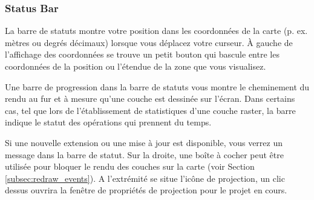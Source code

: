 %
%
%

\subsubsection{Status Bar}\label{label_statusbar}

La barre de statuts montre votre position dans les coordonnées de la carte (p. ex. mètres ou degrés décimaux) lorsque vous déplacez votre curseur. À gauche de l'affichage des coordonnées se trouve un petit bouton qui bascule entre les coordonnées de la position ou l'étendue de la zone que vous visualisez.

Une barre de progression dans la barre de statuts vous montre le cheminement du rendu au fur et à mesure qu'une couche est dessinée sur l'écran. Dans certains cas, tel que lors de l'établissement de statistiques d'une couche raster, la barre indique le statut des opérations qui prennent du temps.

Si une nouvelle extension ou une mise à jour est disponible, vous verrez un message dans la barre de statut. Sur la droite, une boîte à cocher peut être utilisée pour bloquer le rendu des couches sur la carte (voir Section \ref{subsec:redraw_events}). A l'extrémité se situe l'icône de projection,  un clic dessus ouvrira la fenêtre de propriétés de projection pour le projet en cours.

